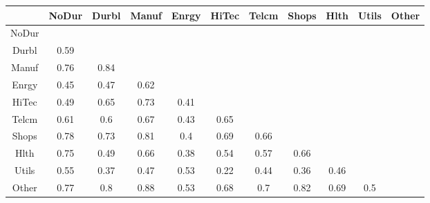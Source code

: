 \begin{tabular}{ccccccccccc}
  \hline
 & NoDur & Durbl & Manuf & Enrgy & HiTec & Telcm & Shops & Hlth & Utils & Other \\ 
  \hline
NoDur &  &  &  &  &  &  &  &  &  &  \\ 
  Durbl & 0.59 &  &  &  &  &  &  &  &  &  \\ 
  Manuf & 0.76 & 0.84 &  &  &  &  &  &  &  &  \\ 
  Enrgy & 0.45 & 0.47 & 0.62 &  &  &  &  &  &  &  \\ 
  HiTec & 0.49 & 0.65 & 0.73 & 0.41 &  &  &  &  &  &  \\ 
  Telcm & 0.61 & 0.6 & 0.67 & 0.43 & 0.65 &  &  &  &  &  \\ 
  Shops & 0.78 & 0.73 & 0.81 & 0.4 & 0.69 & 0.66 &  &  &  &  \\ 
  Hlth & 0.75 & 0.49 & 0.66 & 0.38 & 0.54 & 0.57 & 0.66 &  &  &  \\ 
  Utils & 0.55 & 0.37 & 0.47 & 0.53 & 0.22 & 0.44 & 0.36 & 0.46 &  &  \\ 
  Other & 0.77 & 0.8 & 0.88 & 0.53 & 0.68 & 0.7 & 0.82 & 0.69 & 0.5 &  \\ 
   \hline
\end{tabular}
